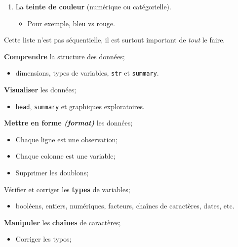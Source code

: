 \documentclass[10pt, french]{article}
\begin{document}
\begin{multicols*}{3}
\begin{algo2}
\begin{enumerate}[leftmargin = *]
		\begin{itemize}
		\item	Pour exemple, gris vs noir.
		\end{itemize}
	\item	La \textbf{teinte de couleur} (numérique ou catégorielle).
		\begin{itemize}
		\item	Pour exemple, bleu vs rouge.
		\end{itemize}
\end{enumerate}
\end{algo2}

\begin{algo2}
Cette liste n'est pas séquentielle, il est surtout important de \textit{tout} le faire.
\begin{todolist}[leftmargin = *]
	\item	\textbf{Comprendre} la structure des données;
		\begin{itemize}[leftmargin = *]
		\item	dimensions, types de variables, \texttt{str} et \texttt{summary}.
		\end{itemize}
	\item	\textbf{Visualiser} les données;
		\begin{itemize}[leftmargin = *]
		\item	\texttt{head}, \texttt{summary} et graphiques exploratoires.
		\end{itemize}
	\item	\textbf{Mettre en forme \textit{(format)}} les données;
		\begin{itemize}[leftmargin = *]
		\item	Chaque ligne est une observation;
		\item	Chaque colonne est une variable;
		\item	Supprimer les doublons;
		\end{itemize}
	\item	Vérifier et corriger les \textbf{types} de variables;
		\begin{itemize}[leftmargin = *]
		\item	booléens, entiers, numériques, facteurs, chaînes de caractères, dates, etc.
		\end{itemize}
	\item	\textbf{Manipuler} les \textbf{chaînes} de caractères;
		\begin{itemize}[leftmargin = *]
		\item	Corriger les typos;

\end{itemize}
\end{todolist}
\end{algo2}
\end{multicols*}
\end{document}
